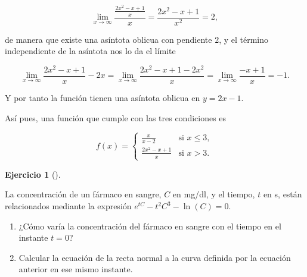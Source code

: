 \documentclass[
  spanish,
  a4paper,
]{scrreport}
\theoremstyle{definition}
\newtheorem{exercise}{Ejercicio}[chapter]
\theoremstyle{remark}
\begin{document}
\begin{tcolorbox}
\[
\lim_{x\to\infty} \frac{\frac{2x^2-x+1}{x}}{x} 
= \frac{2x^2-x+1}{x^2} = 2,
\]

de manera que existe una asíntota oblicua con pendiente \(2\), y el
término independiente de la asíntota nos lo da el límite

\[
\lim_{x\to\infty} \frac{2x^2-x+1}{x}-2x
= \lim_{x\to\infty} \frac{2x^2-x+1-2x^2}{x} 
= \lim_{x\to\infty} \frac{-x+1}{x}
=-1.
\]

Y por tanto la función tienen una asíntota oblicua en \(y=2x-1\).

Así pues, una función que cumple con las tres condiciones es

\[
f(x) =
\begin{cases}
\frac{x}{x-2} & \mbox{si } x\leq 3,\\
\frac{2x^2-x+1}{x} & \mbox{si } x>3.
\end{cases}
\]

\end{tcolorbox}

\begin{exercise}[]\protect\hypertarget{exr-5}{}\label{exr-5}

La concentración de un fármaco en sangre, \(C\) en mg/dl, y el tiempo,
\(t\) en s, están relacionados mediante la expresión
\(e^{tC}-t^2C^3-\ln(C)=0\).

\begin{enumerate}
\def\labelenumi{\alph{enumi}.}
\item
  ¿Cómo varía la concentración del fármaco en sangre con el tiempo en el
  instante \(t=0\)?
\item
  Calcular la ecuación de la recta normal a la curva definida por la
  ecuación anterior en ese mismo instante.
\end{enumerate}

\end{exercise}
\end{document}
